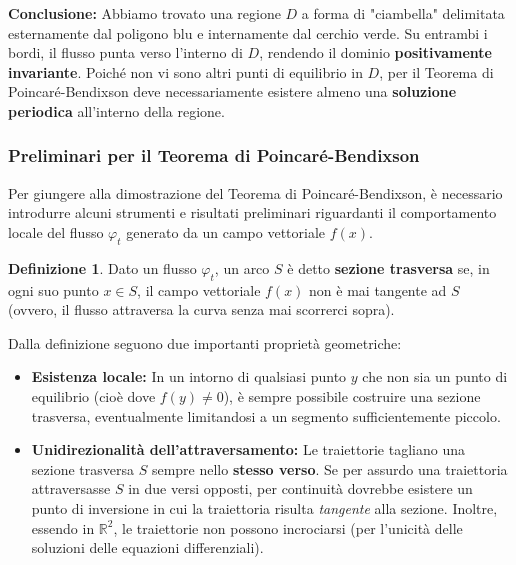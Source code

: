 \documentclass[openany]{book}
\theoremstyle{definition}
\newtheorem*{definizione}{Definizione}
\theoremstyle{remark}
\begin{document}
\textbf{Conclusione:} Abbiamo trovato una regione $D$ a forma di "ciambella" delimitata esternamente dal poligono blu e internamente dal cerchio verde. Su entrambi i bordi, il flusso punta verso l'interno di $D$, rendendo il dominio \textbf{positivamente invariante}. Poiché non vi sono altri punti di equilibrio in $D$, per il Teorema di Poincaré-Bendixson deve necessariamente esistere almeno una \textbf{soluzione periodica} all'interno della regione.

\subsubsection*{Preliminari per il Teorema di Poincaré-Bendixson}

Per giungere alla dimostrazione del Teorema di Poincaré-Bendixson, è necessario introdurre alcuni strumenti e risultati preliminari riguardanti il comportamento locale del flusso $\varphi_t$ generato da un campo vettoriale $f(x)$.

\begin{definizione}
Dato un flusso $\varphi_t$, un arco $S$ è detto \textbf{sezione trasversa} se, in ogni suo punto $x \in S$, il campo vettoriale $f(x)$ non è mai tangente ad $S$ (ovvero, il flusso attraversa la curva senza mai scorrerci sopra).
\end{definizione}

Dalla definizione seguono due importanti proprietà geometriche:
\begin{itemize}
    \item \textbf{Esistenza locale:} In un intorno di qualsiasi punto $y$ che non sia un punto di equilibrio (cioè dove $f(y) \neq 0$), è sempre possibile costruire una sezione trasversa, eventualmente limitandosi a un segmento sufficientemente piccolo.
    \item \textbf{Unidirezionalità dell'attraversamento:} Le traiettorie tagliano una sezione trasversa $S$ sempre nello \textbf{stesso verso}. Se per assurdo una traiettoria attraversasse $S$ in due versi opposti, per continuità dovrebbe esistere un punto di inversione in cui la traiettoria risulta \textit{tangente} alla sezione. Inoltre, essendo in $\mathbb{R}^2$, le traiettorie non possono incrociarsi (per l'unicità delle soluzioni delle equazioni differenziali).
\end{itemize}
\end{document}
